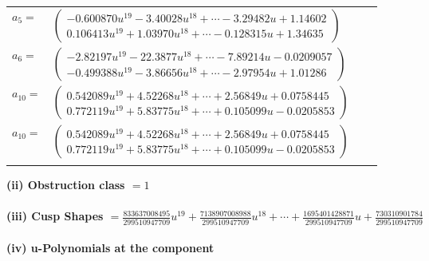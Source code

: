 \documentclass[1p]{elsarticle_modified}
\theoremstyle{definition}
\begin{document}
\begin{tabular}{m{7pt} m{180pt} m{7pt} m{180pt} }
\flushright $a_{5}=$&$\begin{pmatrix}-0.600870 u^{19}-3.40028 u^{18}+\cdots-3.29482 u+1.14602\\0.106413 u^{19}+1.03970 u^{18}+\cdots-0.128315 u+1.34635\end{pmatrix}$ \\
\flushright $a_{6}=$&$\begin{pmatrix}-2.82197 u^{19}-22.3877 u^{18}+\cdots-7.89214 u-0.0209057\\-0.499388 u^{19}-3.86656 u^{18}+\cdots-2.97954 u+1.01286\end{pmatrix}$ \\
\flushright $a_{10}=$&$\begin{pmatrix}0.542089 u^{19}+4.52268 u^{18}+\cdots+2.56849 u+0.0758445\\0.772119 u^{19}+5.83775 u^{18}+\cdots+0.105099 u-0.0205853\end{pmatrix}$\\ \flushright $a_{10}=$&$\begin{pmatrix}0.542089 u^{19}+4.52268 u^{18}+\cdots+2.56849 u+0.0758445\\0.772119 u^{19}+5.83775 u^{18}+\cdots+0.105099 u-0.0205853\end{pmatrix}$\\&\end{tabular}
\flushleft \textbf{(ii) Obstruction class $= 1$}\\~\\
\flushleft \textbf{(iii) Cusp Shapes $= \frac{833637008495}{299510947709} u^{19}+\frac{7138907008988}{299510947709} u^{18}+\cdots+\frac{1695401428871}{299510947709} u+\frac{730310901784}{299510947709}$}\\~\\
\newpage\renewcommand{\arraystretch}{1}
\flushleft \textbf{(iv) u-Polynomials at the component}\newline \\
\end{document}
